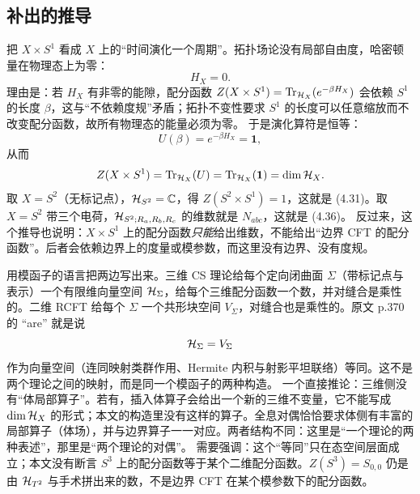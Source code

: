 \subsection{补出的推导}

\begin{derivation}[D-10.1：$Z(X\times S^1)=\dim\cH_X$ 从哪里来]
把 $X\times S^1$ 看成 $X$ 上的“时间演化一个周期”。拓扑场论没有局部自由度，哈密顿量在物理态上为零：
\[
H_X=0 .
\]
理由是：若 $H_X$ 有非零的能隙，配分函数 $Z(X\times S^1)=\operatorname{Tr}_{\mathcal{H}_X}(e^{-\beta H_X})$ 会依赖 $S^1$ 的长度 $\beta$，这与“不依赖度规”矛盾；拓扑不变性要求 $S^1$ 的长度可以任意缩放而不改变配分函数，故所有物理态的能量必须为零。
于是演化算符是恒等：
\[
U(\beta)=e^{-\beta H_X}=\mathbf 1 ,
\]
从而
\[
Z(X\times S^1)=\operatorname{Tr}_{\mathcal{H}_X}(U)=\operatorname{Tr}_{\mathcal{H}_X}(\mathbf 1)=\dim\mathcal{H}_X .
\]
取 $X=S^2$（无标记点），$\mathcal{H}_{S^2}=\mathbb{C}$，得 $Z(S^2\times S^1)=1$，这就是 (4.31)。取 $X=S^2$ 带三个电荷，$\mathcal{H}_{S^2;R_a,R_b,R_c}$ 的维数就是 $N_{abc}$，这就是 (4.36)。
反过来，这个推导也说明：$X\times S^1$ 上的配分函数\emph{只能}给出维数，不能给出“边界 CFT 的配分函数”。后者会依赖边界上的度量或模参数，而这里没有边界、没有度规。\ours
\end{derivation}

\begin{derivation}
用模函子的语言把两边写出来。三维 CS 理论给每个定向闭曲面 $\Sigma$（带标记点与表示）一个有限维向量空间 $\mathcal{H}_\Sigma$，给每个三维配分函数一个数，并对缝合是乘性的。二维 RCFT 给每个 $\Sigma$ 一个共形块空间 $V_\Sigma$，对缝合也是乘性的。原文 p.370 的 “are” 就是说
\[
\mathcal{H}_\Sigma=V_\Sigma
\]
作为向量空间（连同映射类群作用、Hermite 内积与射影平坦联络）等同。这不是两个理论之间的映射，而是同一个模函子的两种构造。
一个直接推论：三维侧没有“体局部算子”。若有，插入体算子会给出一个新的三维不变量，它不能写成 $\dim\mathcal{H}_X$ 的形式；本文的构造里没有这样的算子。全息对偶恰恰要求体侧有丰富的局部算子（体场），并与边界算子一一对应。两者结构不同：这里是“一个理论的两种表述”，那里是“两个理论的对偶”。
需要强调：这个“等同”只在态空间层面成立；本文没有断言 $S^3$ 上的配分函数等于某个二维配分函数。$Z(S^3)=S_{0,0}$ 仍是由 $\mathcal{H}_{T^2}$ 与手术拼出来的数，不是边界 CFT 在某个模参数下的配分函数。\ours
\end{derivation}

